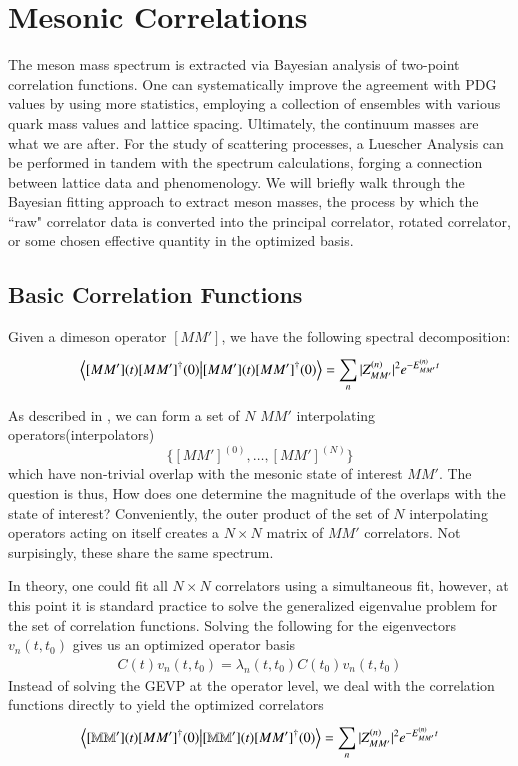 
\chapter{Mesonic Correlations}
\label{sec:signal}

The meson mass spectrum is extracted via Bayesian analysis of two-point correlation functions. One can systematically improve the agreement with PDG values by using more statistics, employing a collection of ensembles with various quark mass values and lattice spacing. Ultimately, the continuum masses are what we are after. For the study of scattering processes, a Luescher Analysis can be performed in tandem with the spectrum calculations, forging a connection between lattice data and phenomenology. We will briefly walk through the Bayesian fitting approach to extract meson masses, the process by which the ``raw" correlator data is converted into the principal correlator, rotated correlator, or some chosen effective quantity in the optimized basis. 

\section{Basic Correlation Functions}
Given a dimeson operator $[MM']$, we have the following spectral decomposition: 
\begin{align}
    \braket{[MM'](t) [MM']^\dagger(0)} = \sum_{n}^{} |Z_{MM'}^{(n)}|^2 e^{-E_{MM'}^{(n)}t}
\end{align}

As described in , we can form a set of $N$ $MM'$ interpolating operators(interpolators) $$\{[MM']^{(0)},\dots,[MM']^{(N)}\}$$ which have non-trivial overlap with the mesonic state of interest $MM'$. The question is thus, How does one determine the magnitude of the overlaps with the state of interest? Conveniently, the outer product of the set of $N$ interpolating operators acting on itself creates a $N \times N$ matrix of $MM'$ correlators. Not surpisingly, these share the same spectrum. 

In theory, one could fit all $N \times N$ correlators using a simultaneous fit, however, at this point it is standard practice to solve the generalized eigenvalue problem for the set of correlation functions. Solving the following for the eigenvectors $v_n(t,t_0)$ gives us an optimized operator basis
\begin{align}
    C(t)v_n(t,t_0) = \lambda_n(t,t_0)C(t_0)v_n(t,t_0)
\end{align}
Instead of solving the GEVP at the operator level, we deal with the correlation functions directly to yield the optimized correlators 
\begin{align}
    \braket{[\mathbb{MM'}](t) [MM']^\dagger(0)} = \sum_{n}^{} |Z_{MM'}^{(n)}|^2 e^{-E_{MM'}^{(n)}t} 
\end{align}


